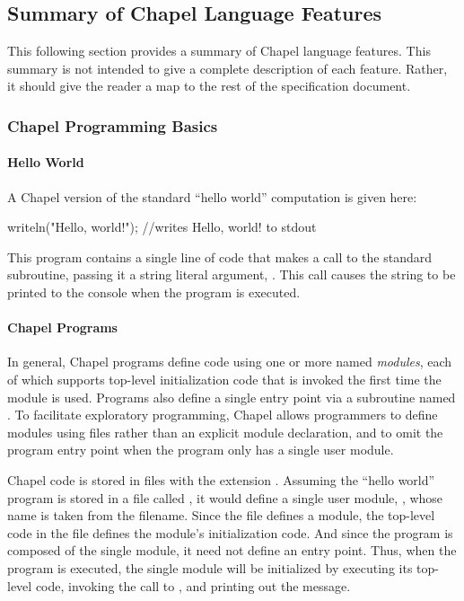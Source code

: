 \subsection{Summary of Chapel Language Features}

This following section provides a summary of Chapel language features.  
This summary is not intended to give a complete description of each feature.
Rather, it should give the reader a map to the rest of the specification
document.  

\subsubsection{Chapel Programming Basics}
\paragraph{Hello World} 
A Chapel version of the standard ``hello world'' computation is given
here:
\begin{chapel}
writeln("Hello, world!"); //writes Hello, world! to stdout
\end{chapel}
\noindent This program contains a single line of code that makes a
call to the standard  subroutine, passing it a string
literal argument, .  This call causes the string
to be printed to the console when the program is executed.

\paragraph{Chapel Programs}
In general, Chapel programs define code using one or more named
\emph{modules}, each of which supports top-level initialization code
that is invoked the first time the module is used.  Programs also
define a single entry point via a subroutine named .  To
facilitate exploratory programming, Chapel allows programmers to
define modules using files rather than an explicit module declaration,
and to omit the program entry point when the program only has a single
user module.  

Chapel code is stored in files with the extension .
Assuming the ``hello world'' program is stored in a file called 
, it
would define a single user module, , whose name is taken
from the filename.  Since the file defines a module, the top-level
code in the file defines the module's initialization code.  And since
the program is composed of the single  module, it need not
define an entry point.  Thus, when the program is executed, the single
 module will be initialized by executing its top-level
code, invoking the call to , and printing out the
message.

